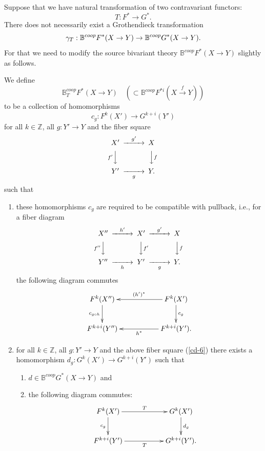 \documentclass[a4paper]{amsart}
\begin{document}
Suppose that we have natural transformation of two contravariant functors:
$$T:F^* \to G^*.$$
There does not necessarily exist a Grothendieck transformation
$$\gamma_T: \mathbb B^{coop} F^*(X \to Y)  \to  \mathbb B^{coop} G^*(X \to Y)  .$$
For that we need to modify the source bivariant theory $\mathbb B^{coop} F^*(X \to Y)$ slightly as follows.
\begin{defn} We define 
$$\mathbb B^{coop}_T F^*(X \to Y) \quad (\subset \mathbb B^{coop}F^{* i}(X \xrightarrow f Y) )$$
to be a collection of %
homomorphisms
$$c_g: F^k(X') \to G^{k+i}(Y')$$
for all $k \in \mathbb Z$, all $g:Y' \to Y$  and the fiber square \, \, \, 
\begin{equation}\label{cd-6}
\CD
X' @> {g'}  >> X\\
@V {f'} VV @VV fV\\
Y' @>> {g} > Y.\\
\endCD
\end{equation}
such that
\begin{enumerate}
\item these homomorphisms $c_g$ are
required to be compatible with pullback, i.e., for a fiber diagram
\begin{equation*}
\CD
X'' @> {h'}  >> X' @> {g'}  >> X\\
@V {f''} VV @VV f'V @VV fV\\
Y'' @>> {h} > Y' @>> {g} > Y.\\
\endCD
\end{equation*}
the following diagram commutes
\begin{equation*}
\xymatrix
{F^k(X'') \ar[d]_{c_{g \circ h}} && F^k(X')\ar[ll]_{(h')^*} \ar[d]^{c_g}\\
F^{k+i}(Y'') && F^{k+i}(Y') \ar[ll]^{h^*}.
}
\end{equation*}

\item for all $k \in \mathbb Z$, all $g:Y' \to Y$  and the above fiber square (\ref{cd-6}) there exists a %
homomorphism $d_g:  G^k(X') \to G^{k+i}(Y')$ such that 
\begin{enumerate}
\item $d \in  \mathbb B^{coop} G^*(X \to Y)$ and 
\item the following diagram commutes:
\begin{equation}\label{cd-7}
\xymatrix
{F^k(X') \ar[d]_{c_g} \ar[rr]^T && G^k(X') \ar[d]^{d_g}\\
F^{k+i}(Y') \ar[rr]_T && G^{k+i}(Y'). 
}
\end{equation}
\end{enumerate}
\end{enumerate}
\end{defn}
\end{document}
